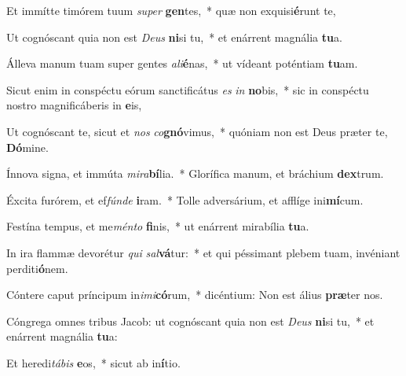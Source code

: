 \item Et immítte timórem tuum \textit{su}\textit{per} \textbf{gen}tes,~* quæ non exquisi\textbf{é}runt te,
\item Ut cognóscant quia non est \textit{De}\textit{us} \textbf{ni}si tu,~* et enárrent magnália \textbf{tu}a.
\item Álleva manum tuam super gentes \textit{a}\textit{li}\textbf{é}nas,~* ut vídeant poténtiam \textbf{tu}am.
\item Sicut enim in conspéctu eórum sanctificátus \textit{es} \textit{in} \textbf{no}bis,~* sic in conspéctu nostro magnificáberis in \textbf{e}is,
\item Ut cognóscant te, sicut et \textit{nos} \textit{co}\textbf{gnó}vimus,~* quóniam non est Deus præter te, \textbf{Dó}mine.
\item Ínnova signa, et immúta \textit{mi}\textit{ra}\textbf{bí}lia.~* Glorífica manum, et bráchium \textbf{dex}trum.
\item Éxcita furórem, et ef\textit{fún}\textit{de} \textbf{i}ram.~* Tolle adversárium, et afflíge ini\textbf{mí}cum.
\item Festína tempus, et me\textit{mén}\textit{to} \textbf{fi}nis,~* ut enárrent mirabília \textbf{tu}a.
\item In ira flammæ devorétur \textit{qui} \textit{sal}\textbf{vá}tur:~* et qui péssimant plebem tuam, invéniant perditi\textbf{ó}nem.
\item Cóntere caput príncipum in\textit{i}\textit{mi}\textbf{có}rum,~* dicéntium: Non est álius \textbf{præ}ter nos.
\item Cóngrega omnes tribus Jacob: ut cognóscant quia non est \textit{De}\textit{us} \textbf{ni}si tu,~* et enárrent magnália \textbf{tu}a:
\item Et heredi\textit{tá}\textit{bis} \textbf{e}os,~* sicut ab in\textbf{í}tio.
